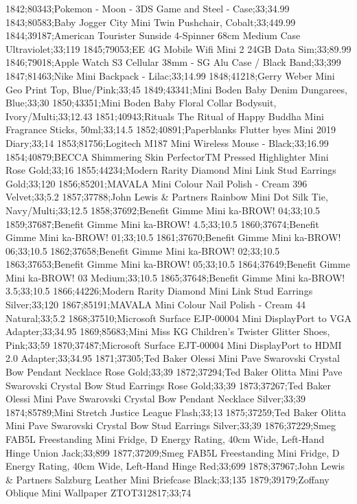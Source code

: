 1842;80343;Pokemon - Moon - 3DS Game and Steel - Case;33;34.99
1843;80583;Baby Jogger City Mini Twin Pushchair, Cobalt;33;449.99
1844;39187;American Tourister Sunside 4-Spinner 68cm Medium Case Ultraviolet;33;119
1845;79053;EE 4G Mobile Wifi Mini 2 24GB Data Sim;33;89.99
1846;79018;Apple Watch S3 Cellular 38mm - SG Alu Case / Black Band;33;399
1847;81463;Nike Mini Backpack - Lilac;33;14.99
1848;41218;Gerry Weber Mini Geo Print Top, Blue/Pink;33;45
1849;43341;Mini Boden Baby Denim Dungarees, Blue;33;30
1850;43351;Mini Boden Baby Floral Collar Bodysuit, Ivory/Multi;33;12.43
1851;40943;Rituals The Ritual of Happy Buddha Mini Fragrance Sticks, 50ml;33;14.5
1852;40891;Paperblanks Flutter byes Mini 2019 Diary;33;14
1853;81756;Logitech M187 Mini Wireless Mouse - Black;33;16.99
1854;40879;BECCA Shimmering Skin PerfectorTM Pressed Highlighter Mini Rose Gold;33;16
1855;44234;Modern Rarity Diamond Mini Link Stud Earrings Gold;33;120
1856;85201;MAVALA Mini Colour Nail Polish - Cream 396 Velvet;33;5.2
1857;37788;John Lewis & Partners Rainbow Mini Dot Silk Tie, Navy/Multi;33;12.5
1858;37692;Benefit Gimme Mini ka-BROW! 04;33;10.5
1859;37687;Benefit Gimme Mini ka-BROW! 4.5;33;10.5
1860;37674;Benefit Gimme Mini ka-BROW! 01;33;10.5
1861;37670;Benefit Gimme Mini ka-BROW! 06;33;10.5
1862;37658;Benefit Gimme Mini ka-BROW! 02;33;10.5
1863;37653;Benefit Gimme Mini ka-BROW! 05;33;10.5
1864;37649;Benefit Gimme Mini ka-BROW! 03 Medium;33;10.5
1865;37648;Benefit Gimme Mini ka-BROW! 3.5;33;10.5
1866;44226;Modern Rarity Diamond Mini Link Stud Earrings Silver;33;120
1867;85191;MAVALA Mini Colour Nail Polish - Cream 44 Natural;33;5.2
1868;37510;Microsoft Surface EJP-00004 Mini DisplayPort to VGA Adapter;33;34.95
1869;85683;Mini Miss KG Children's Twister Glitter Shoes, Pink;33;59
1870;37487;Microsoft Surface EJT-00004 Mini DisplayPort to HDMI 2.0 Adapter;33;34.95
1871;37305;Ted Baker Olessi Mini Pave Swarovski Crystal Bow Pendant Necklace Rose Gold;33;39
1872;37294;Ted Baker Olitta Mini Pave Swarovski Crystal Bow Stud Earrings Rose Gold;33;39
1873;37267;Ted Baker Olessi Mini Pave Swarovski Crystal Bow Pendant Necklace Silver;33;39
1874;85789;Mini Stretch Justice League Flash;33;13
1875;37259;Ted Baker Olitta Mini Pave Swarovski Crystal Bow Stud Earrings Silver;33;39
1876;37229;Smeg FAB5L Freestanding Mini Fridge, D Energy Rating, 40cm Wide, Left-Hand Hinge Union Jack;33;899
1877;37209;Smeg FAB5L Freestanding Mini Fridge, D Energy Rating, 40cm Wide, Left-Hand Hinge Red;33;699
1878;37967;John Lewis & Partners Salzburg Leather Mini Briefcase Black;33;135
1879;39179;Zoffany Oblique Mini Wallpaper ZTOT312817;33;74
